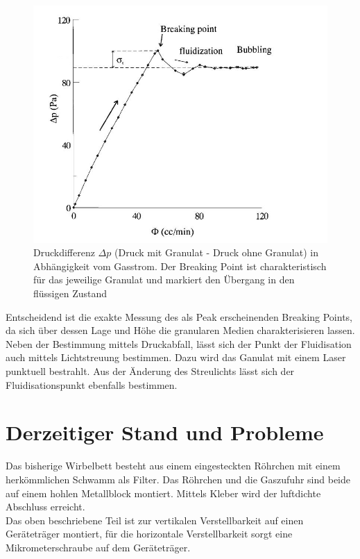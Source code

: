 \begin{figure}[h!]
	\begin{center}
		\includegraphics[scale=0.6]{Castellanos_Diagramm.jpg}
		\caption[Fluidisierungsdiagramm]{Druckdifferenz $\Delta p$ (Druck mit Granulat - Druck ohne Granulat) in Abhängigkeit vom Gasstrom. Der Breaking Point ist charakteristisch für das jeweilige Granulat und markiert den Übergang in den flüssigen Zustand \cite{Castellanos2000}}
	\end{center}
\end{figure}

Entscheidend ist die exakte Messung des als Peak erscheinenden Breaking Points, da sich über dessen Lage und Höhe die granularen Medien charakterisieren lassen. \\
Neben der Bestimmung mittels Druckabfall, lässt sich der Punkt der Fluidisation auch mittels Lichtstreuung bestimmen. Dazu wird das Ganulat mit einem Laser punktuell bestrahlt. Aus der Änderung des Streulichts lässt sich der Fluidisationspunkt ebenfalls bestimmen. 


\newpage

\section{Derzeitiger Stand und Probleme}


Das bisherige Wirbelbett besteht aus einem eingesteckten Röhrchen mit einem herkömmlichen Schwamm als Filter. Das Röhrchen und die Gaszufuhr sind beide auf einem hohlen Metallblock montiert. Mittels Kleber wird der luftdichte Abschluss erreicht. \\
Das oben beschriebene Teil ist zur vertikalen Verstellbarkeit auf einen Geräteträger montiert, für die horizontale Verstellbarkeit sorgt eine Mikrometerschraube auf dem Geräteträger. 


